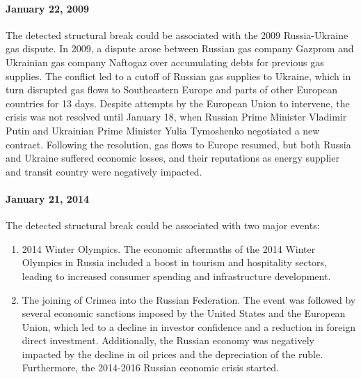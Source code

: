             \paragraph{January 22, 2009} The detected structural break could be associated with the 2009 Russia-Ukraine gas dispute. In 
            2009, a dispute arose between Russian gas company Gazprom and Ukrainian gas company Naftogaz over accumulating debts for previous 
            gas supplies. The conflict led to a cutoff of Russian gas supplies to Ukraine, which in turn disrupted gas flows to Southeastern 
            Europe and parts of other European countries for 13 days. Despite attempts by the European Union to intervene, the crisis was not 
            resolved until January 18, when Russian Prime Minister Vladimir Putin and Ukrainian Prime Minister Yulia Tymoshenko negotiated a 
            new contract. Following the resolution, gas flows to Europe resumed, but both Russia and Ukraine suffered economic losses, and 
            their reputations as energy supplier and transit country were negatively impacted.
            \paragraph{January 21, 2014} The detected structural break could be associated with two major events: 
            \begin{enumerate}
                \item 2014 Winter Olympics. The economic aftermaths of the 2014 Winter Olympics in Russia included a boost in tourism and 
                hospitality sectors, leading to increased consumer spending and infrastructure development.
                \item The joining of Crimea into the Russian Federation. The event was followed by several economic sanctions imposed by 
                the United States and the European Union, which led to a decline in investor confidence and a reduction in foreign direct 
                investment. Additionally, the Russian economy was negatively impacted by the decline in oil prices and the depreciation 
                of the ruble. Furthermore, the 2014-2016 Russian economic crisis started.
            \end{enumerate}
